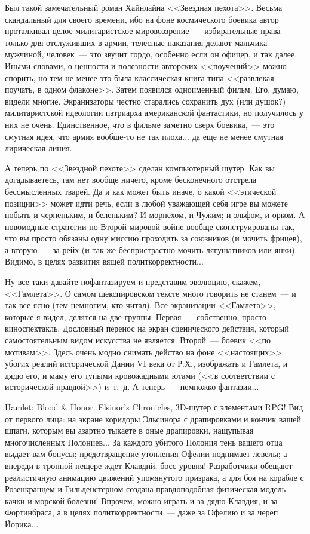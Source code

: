 \documentclass{scrbook}
\newcommand{\flqq}{<<}
\newcommand{\frqq}{>>}
\newcommand{\mdash}{~--- }
\newcommand{\commamdash}{~--- } %
\begin{document}
Был такой замечательный роман Хайнлайна {\flqq}Звездная пехота{\frqq}. Весьма скандальный для своего времени, ибо на фоне космического боевика автор проталкивал целое милитаристское мировоззрение{\mdash}избирательные права только для отслуживших в армии, телесные наказания делают мальчика мужчиной, человек{\mdash}это звучит гордо, особенно если он офицер, и так далее. Иными словами, о ценности и полезности авторских {\flqq}поучений{\frqq} можно спорить, но тем не менее это была классическая книга типа {\flqq}развлекая{\mdash}поучать, в одном флаконе{\frqq}. Затем появился одноименный фильм. Его, думаю, видели многие. Экранизаторы честно старались сохранить дух (или душок?) милитаристской идеологии патриарха американской фантастики, но получилось у них не очень. Единственное, что в фильме заметно сверх боевика,{\commamdash}это смутная идея, что армия вообще-то не так плоха... да еще не менее смутная лирическая линия.

А теперь по {\flqq}Звездной пехоте{\frqq} сделан компьютерный шутер. Как вы догадываетесь, там нет вообще ничего, кроме бесконечного отстрела бессмысленных тварей. Да и как может быть иначе, о какой {\flqq}этической позиции{\frqq} может идти речь, если в любой уважающей себя игре вы можете побыть и черненьким, и беленьким? И морпехом, и Чужим; и эльфом, и орком. А новомодные стратегии по Второй мировой войне вообще сконструированы так, что вы просто обязаны одну миссию проходить за союзников (и мочить фрицев), а вторую{\mdash}за рейх (и так же беспристрастно мочить лягушатников или янки). Видимо, в целях развития вящей политкорректности...

Ну все-таки давайте пофантазируем и представим эволюцию, скажем, {\flqq}Гамлета{\frqq}. О самом шекспировском тексте много говорить не станем{\mdash}и так все ясно (тем немногим, кто читал). Все экранизации {\flqq}Гамлета{\frqq}, которые я видел, делятся на две группы. Первая{\mdash}собственно, просто киноспектакль. Дословный перенос на экран сценического действия, который самостоятельным видом искусства не является. Второй{\mdash}боевик {\flqq}по мотивам{\frqq}. Здесь очень модно снимать действо на фоне {\flqq}настоящих{\frqq} убогих реалий исторической Дании VI века от Р.Х., изображать и Гамлета, и дядю его, и маму его тупыми кровожадными ютами ({\flqq}в соответствии с исторической правдой{\frqq}) и~т.~д. А теперь{\mdash}немножко фантазии...

Hamlet: Blood \& Honor. Elsinor’s Chronicles, 3D-шутер с элементами RPG! Вид от первого лица: на экране коридоры Эльсинора с драпировками и кончик вашей шпаги, которым вы азартно тыкаете в оные драпировки, нащупывая многочисленных Полониев... За каждого убитого Полония тень вашего отца выдает вам бонусы; предотвращение утопления Офелии поднимает левелы; а впереди в тронной пещере ждет Клавдий, босс уровня! Разработчики обещают реалистичную анимацию движений упомянутого призрака, а для боя на корабле с Розенкранцем и Гильденстерном создана правдоподобная физическая модель качки и морской болезни! Впрочем, можно играть и за дядю Клавдия, и за Фортинбраса, а в целях политкорректности{\mdash}даже за Офелию и за череп Йорика...
\end{document}
